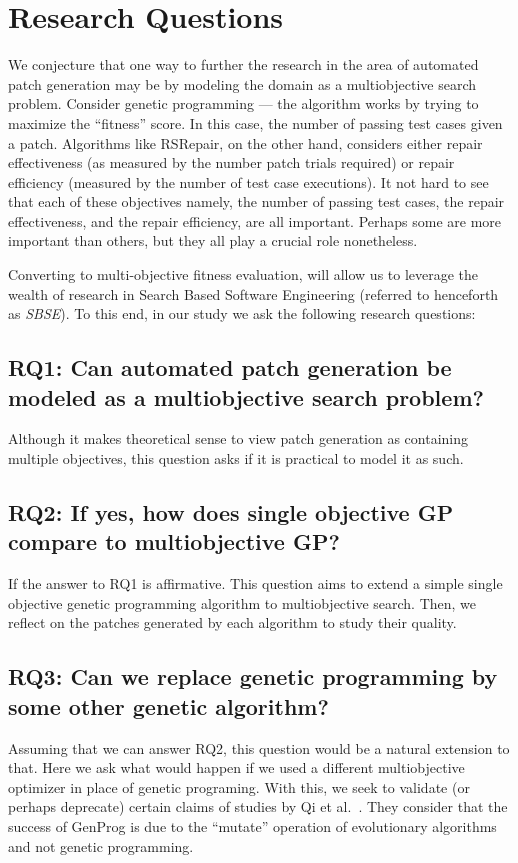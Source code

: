 \documentclass{sig-alternate}
\theoremstyle{break}
\begin{document}
\section{Research Questions}
\label{rq}
We conjecture that one way to further the research in the area of automated patch generation may be by modeling the domain as a multiobjective search problem. Consider genetic programming --- the algorithm works by trying to maximize the ``fitness'' score. In this case, the number of passing test cases given a patch. Algorithms like RSRepair, on the other hand, considers either repair effectiveness (as measured by the number patch trials required) or repair efficiency (measured by the number of test case executions). It not hard to see that each of these objectives namely, the number of passing test cases, the repair effectiveness, and the repair efficiency, are all important. Perhaps some are more important than others, but they all play a crucial role nonetheless. 

Converting to multi-objective fitness evaluation, will allow us to leverage the wealth of research in Search Based Software Engineering (referred to henceforth as \textit{SBSE}). To this end, in our study we ask the following research questions:

\subsection*{RQ1: Can automated patch generation be modeled as a multiobjective search problem?}
\label{rq1}
Although it makes theoretical sense to view patch generation as containing multiple objectives, this question asks if it is practical to model it as such.

\subsection*{RQ2: If yes, how does single objective GP compare to multiobjective GP?}
\label{rq2}
If the answer to RQ1 is affirmative. This question aims to extend a simple single objective genetic programming algorithm to multiobjective search. Then, we reflect on the patches generated by each algorithm to study their quality.

\subsection*{RQ3: Can we replace genetic programming by some other genetic algorithm?}
\label{rq3}
Assuming that we can answer RQ2, this question would be a natural extension to that. Here we ask what would happen if we used a different multiobjective optimizer in place of genetic programing. With this, we seek to validate (or perhaps deprecate) certain claims of studies by Qi et al.~\cite{qi2014}. They consider that the success of GenProg is due to the ``mutate'' operation of evolutionary algorithms and not genetic programming. 
\end{document}
